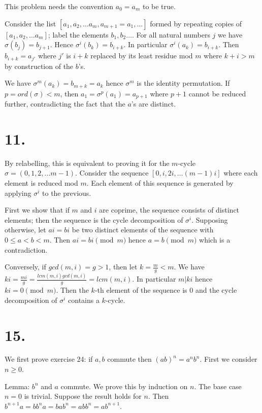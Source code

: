\documentclass{article}
\begin{document}
This problem needs the convention $a_0 = a_m$ to be true.

Consider the list $[a_1, a_2, \ldots a_m, a_{m+1} = a_1, \ldots]$ formed by repeating copies of $[a_1, a_2, \ldots a_m]$; label the elements $b_1, b_2 \ldots$. For all natural numbers $j$ we have $\sigma(b_j) = b_{j+1}$. Hence $\sigma^i(b_k) = b_{i+k}$. In particular $\sigma^i(a_k) = b_{i+k}$. Then $b_{i+k} = a_{j'}$ where $j'$ is $i+k$ replaced by its least residue mod $m$ where $k+i > m$ by construction of the $b$'s.

We have $\sigma^m(a_k) = b_{m+k} = a_k$ hence $\sigma^m$ is the identity permutation. If $p = ord(\sigma) < m$, then $a_1 = \sigma^{p}(a_1) = a_{p+1}$ where $p+1$ cannot be reduced further, contradicting the fact that the $a$'s are distinct.

\section*{11.}

By relabelling, this is equivalent to proving it for the $m$-cycle $\sigma = (0, 1, 2, \ldots m-1)$. Consider the sequence $[0, i, 2i, \ldots (m-1)i]$ where each element is reduced mod $m$. Each element of this sequence is generated by applying $\sigma^i$ to the previous.

First we show that if $m$ and $i$ are coprime, the sequence consists of distinct elements; then the sequence is the cycle decomposition of $\sigma^i$. Supposing otherwise, let $ai = bi$ be two distinct elements of the sequence with $0 \le a < b < m$. Then $ai = bi \pmod m$ hence $a = b \pmod m$ which is a contradiction.

Conversely, if $gcd(m, i) = g > 1$, then let $k = \frac{m}{g} < m$. We have $ki = \frac{mi}{g} = \frac{lcm(m, i)gcd(m, i)}{g} = lcm(m, i)$. In particular $m | ki$ hence $ki = 0 \pmod m$. Then the $k$-th element of the sequence is $0$ and the cycle decomposition of $\sigma^i$ contains a $k$-cycle.

\section*{15.}

We first prove exercise 24: if $a, b$ commute then $(ab)^n = a^nb^n$. First we consider $n \ge 0$.

Lemma: $b^n$ and $a$ commute. We prove this by induction on $n$. The base case $n=0$ is trivial. Suppose the result holds for $n$. Then $b^{n+1}a = bb^na = bab^n = abb^n = a b^{n+1}$.
\end{document}
